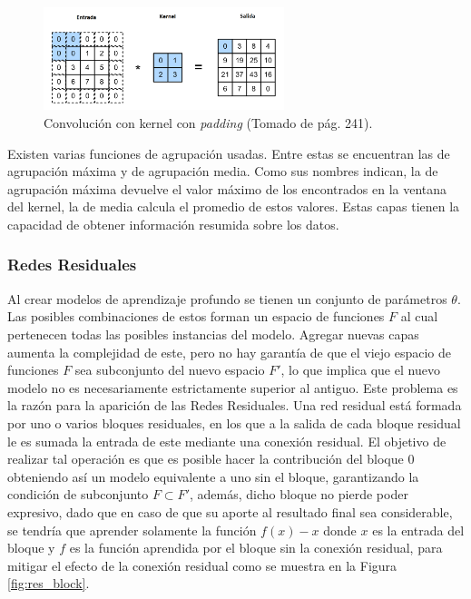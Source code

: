 \documentclass[a4paper,11pt,twocolumn,twoside]{article}
\begin{document}
\begin{figure}[h]
    \centering
	\includegraphics[width=7cm,clip]{Graphics/kernel_convolution_padding.png}
	\caption{Convolución con kernel con \textit{padding} (Tomado de \cite{d2l} pág. 241).}
	\label{fig:conv_kernel_padding}
\end{figure}

Existen varias funciones de agrupación usadas. Entre estas se encuentran las de agrupación máxima y de 
agrupación media. Como sus nombres indican, la de agrupación máxima devuelve el valor máximo de los encontrados
en la ventana del kernel, la de media calcula el promedio de estos valores. Estas capas tienen la capacidad de obtener
información resumida sobre los datos.

\subsubsection{Redes Residuales}

Al crear modelos de aprendizaje profundo se tienen un conjunto de parámetros $\theta$. Las posibles combinaciones 
de estos forman un espacio de funciones $F$ al cual pertenecen todas las posibles instancias del modelo.
Agregar nuevas capas aumenta la complejidad de este, pero no hay garantía de que el viejo espacio 
de funciones $F$ sea subconjunto del nuevo espacio $F'$, lo que implica que el nuevo modelo no es necesariamente
estrictamente superior al antiguo. Este problema es la razón para la aparición de las Redes Residuales. 
Una red residual está formada por 
uno o varios bloques residuales, en los que a la salida de cada bloque residual le es sumada la entrada de 
este mediante una conexión residual.
El objetivo de realizar tal operación es que es posible hacer la contribución del bloque 0 obteniendo así
un modelo equivalente a uno sin el bloque, garantizando la condición de subconjunto $F \subset F'$, además,
dicho bloque no pierde poder expresivo, dado que en caso de que su aporte al resultado final sea considerable, 
se tendría que aprender solamente la función $f(x) - x$ donde $x$ es la entrada del bloque y $f$ es la función 
aprendida por el bloque sin la conexión residual, para mitigar el efecto de la conexión residual como se muestra
en la Figura \ref{fig:res_block}.
\end{document}
